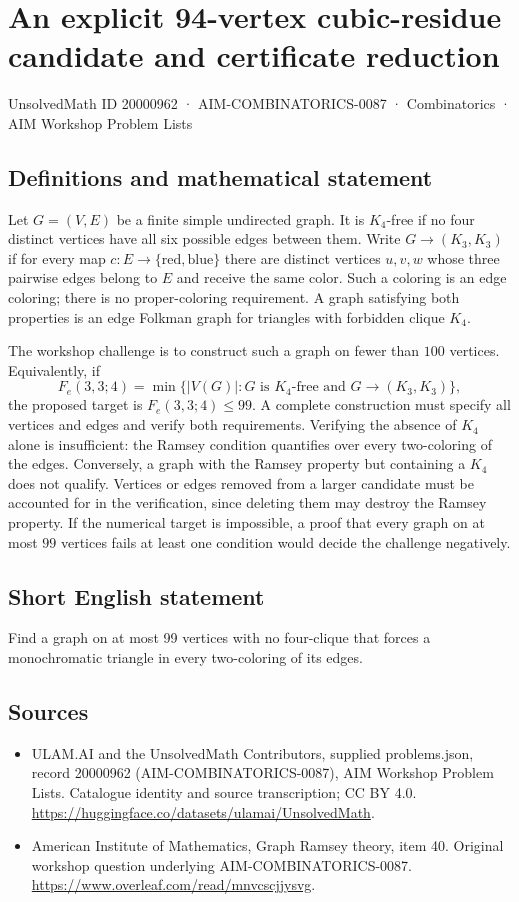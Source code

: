 \documentclass[11pt,a4paper]{article}
\begin{document}
\section*{An explicit 94-vertex cubic-residue candidate and certificate reduction}\label{20000962}
{\small UnsolvedMath ID 20000962 · AIM-COMBINATORICS-0087 · Combinatorics · AIM Workshop Problem Lists}
\subsection{Definitions and mathematical statement}
Let $G=(V,E)$ be a finite simple undirected graph. It is $K_4$-free
if no four distinct vertices have all six possible edges between them.
Write $G\to(K_3,K_3)$ if for every map $c:E\to\{\mathrm{red},\mathrm{blue}\}$
there are distinct vertices $u,v,w$ whose three pairwise edges belong
to $E$ and receive the same color. Such a coloring is an edge coloring;
there is no proper-coloring requirement.
A graph satisfying both properties is an edge Folkman graph for
triangles with forbidden clique $K_4$.

The workshop challenge is to construct such a graph on fewer than
$100$ vertices. Equivalently, if
\[
 F_e(3,3;4)=\min\{|V(G)|:G\text{ is }K_4\text{-free and }
                                     G\to(K_3,K_3)\},
\]
the proposed target is $F_e(3,3;4)\le99$.
A complete construction must specify all vertices and edges and verify
both requirements. Verifying the absence of $K_4$ alone is insufficient:
the Ramsey condition quantifies over every two-coloring of the edges.
Conversely, a graph with the Ramsey property but containing a $K_4$
does not qualify. Vertices or edges removed from a larger candidate
must be accounted for in the verification, since deleting them may
destroy the Ramsey property. If the numerical target is impossible,
a proof that every graph on at most $99$ vertices fails at least one
condition would decide the challenge negatively.
\subsection{Short English statement}
Find a graph on at most 99 vertices with no four-clique that forces a monochromatic triangle in every two-coloring of its edges.
\subsection{Sources}
\begin{itemize}
\item[S1] ULAM.AI and the UnsolvedMath Contributors, supplied problems.json, record 20000962 (AIM-COMBINATORICS-0087), AIM Workshop Problem Lists. Catalogue identity and source transcription; CC BY 4.0.
\url{https://huggingface.co/datasets/ulamai/UnsolvedMath}.
\item[S2] American Institute of Mathematics, Graph Ramsey theory, item 40. Original workshop question underlying AIM-COMBINATORICS-0087.
\url{https://www.overleaf.com/read/mnvcscjjysvg}.
\end{itemize}
\end{document}
